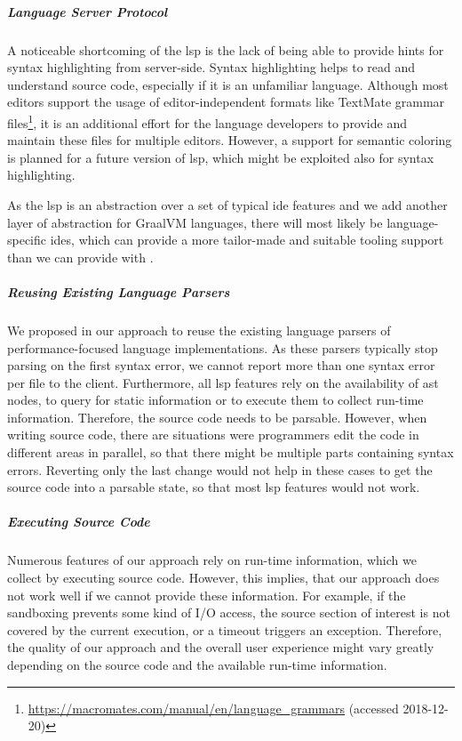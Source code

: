 \subparagraph{Language Server Protocol}
A noticeable shortcoming of the \ac{lsp} is the lack of being able to provide hints for syntax highlighting from server-side. Syntax highlighting helps to read and understand source code, especially if it is an unfamiliar language. Although most editors support the usage of editor-independent formats like TextMate grammar files\footnote{\url{https://macromates.com/manual/en/language_grammars} (accessed 2018-12-20)}, it is an additional effort for the language developers to provide and maintain these files for multiple editors. However, a support for semantic coloring is planned for a future version of \ac{lsp}, which might be exploited also for syntax highlighting.

As the \ac{lsp} is an abstraction over a set of typical \ac{ide} features and we add another layer of abstraction for GraalVM languages, there will most likely be language-specific \acp{ide}, which can provide a more tailor-made and suitable tooling support than we can provide with \graallsp. 

\subparagraph{Reusing Existing Language Parsers}
We proposed in our approach to reuse the existing language parsers of performance-focused language implementations. As these parsers typically stop parsing on the first syntax error, we cannot report more than one syntax error per file to the client. Furthermore, all \ac{lsp} features rely on the availability of \ac{ast} nodes, to query for static information or to execute them to collect run-time information. Therefore, the source code needs to be parsable. However, when writing source code, there are situations were programmers edit the code in different areas in parallel, so that there might be multiple parts containing syntax errors. Reverting only the last change would not help in these cases to get the source code into a parsable state, so that most \ac{lsp} features would not work.

\subparagraph{Executing Source Code}
Numerous features of our approach rely on run-time information, which we collect by executing source code. However, this implies, that our approach does not work well if we cannot provide these information. For example, if the sandboxing prevents some kind of I/O access, the source section of interest is not covered by the current execution, or a timeout triggers an exception. Therefore, the quality of our approach and the overall user experience might vary greatly depending on the source code and the available run-time information.



